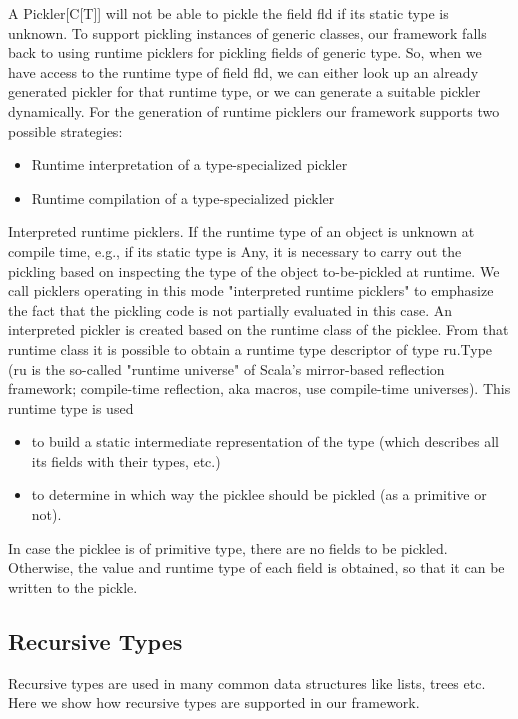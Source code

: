 \documentclass[preprint,10pt]{sigplanconf}
\begin{document}
A Pickler[C[T]] will not be able to pickle the field fld if its static type is unknown. To support pickling instances of generic classes, our framework falls back to using runtime picklers for pickling fields of generic type. So, when we have access to the runtime type of field fld, we can either look up an already generated pickler for that runtime type, or we can generate a suitable pickler dynamically. For the generation of runtime picklers our framework supports two possible strategies:

\begin{itemize}
\item Runtime interpretation of a type-specialized pickler
\item Runtime compilation of a type-specialized pickler
\end{itemize}

Interpreted runtime picklers. If the runtime type of an object is unknown at compile time, e.g., if its static type is Any, it is necessary to carry out the pickling based on inspecting the type of the object to-be-pickled at runtime. We call picklers operating in this mode "interpreted runtime picklers" to emphasize the fact that the pickling code is not partially evaluated in this case. An interpreted pickler is created based on the runtime class of the picklee. From that runtime class it is possible to obtain a runtime type descriptor of type ru.Type (ru is the so-called "runtime universe" of Scala's mirror-based reflection framework; compile-time reflection, aka macros, use compile-time universes). This runtime type is used

\begin{itemize}
\item to build a static intermediate representation of the type (which describes all its fields with their types, etc.)
\item to determine in which way the picklee should be pickled (as a primitive or not).
\end{itemize}

In case the picklee is of primitive type, there are no fields to be pickled. Otherwise, the value and runtime type of each field is obtained, so that it can be written to the pickle.

\subsection{Recursive Types}

Recursive types are used in many common data structures like lists, trees etc. Here we show how recursive types are supported in our framework.
\end{document}
